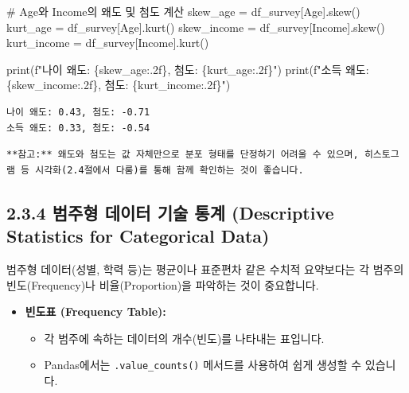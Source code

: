 \documentclass[
  letterpaper,
]{book}
\newenvironment{Shaded}{\begin{snugshade}}{\end{snugshade}}
\newcommand{\BuiltInTok}[1]{\textcolor[rgb]{0.00,0.23,0.31}{#1}}
\newcommand{\CommentTok}[1]{\textcolor[rgb]{0.37,0.37,0.37}{#1}}
\newcommand{\NormalTok}[1]{\textcolor[rgb]{0.00,0.23,0.31}{#1}}
\newcommand{\OperatorTok}[1]{\textcolor[rgb]{0.37,0.37,0.37}{#1}}
\newcommand{\SpecialCharTok}[1]{\textcolor[rgb]{0.37,0.37,0.37}{#1}}
\newcommand{\SpecialStringTok}[1]{\textcolor[rgb]{0.13,0.47,0.30}{#1}}
\newcommand{\StringTok}[1]{\textcolor[rgb]{0.13,0.47,0.30}{#1}}
\providecommand{\tightlist}{%
  \setlength{\itemsep}{0pt}\setlength{\parskip}{0pt}}
\begin{document}
\begin{Shaded}
\begin{Highlighting}[]
    \CommentTok{\# Age와 Income의 왜도 및 첨도 계산}
\NormalTok{    skew\_age }\OperatorTok{=}\NormalTok{ df\_survey[}\StringTok{\textquotesingle{}Age\textquotesingle{}}\NormalTok{].skew()}
\NormalTok{    kurt\_age }\OperatorTok{=}\NormalTok{ df\_survey[}\StringTok{\textquotesingle{}Age\textquotesingle{}}\NormalTok{].kurt()}
\NormalTok{    skew\_income }\OperatorTok{=}\NormalTok{ df\_survey[}\StringTok{\textquotesingle{}Income\textquotesingle{}}\NormalTok{].skew()}
\NormalTok{    kurt\_income }\OperatorTok{=}\NormalTok{ df\_survey[}\StringTok{\textquotesingle{}Income\textquotesingle{}}\NormalTok{].kurt()}

    \BuiltInTok{print}\NormalTok{(}\SpecialStringTok{f"나이 왜도: }\SpecialCharTok{\{}\NormalTok{skew\_age}\SpecialCharTok{:.2f\}}\SpecialStringTok{, 첨도: }\SpecialCharTok{\{}\NormalTok{kurt\_age}\SpecialCharTok{:.2f\}}\SpecialStringTok{"}\NormalTok{)}
    \BuiltInTok{print}\NormalTok{(}\SpecialStringTok{f"소득 왜도: }\SpecialCharTok{\{}\NormalTok{skew\_income}\SpecialCharTok{:.2f\}}\SpecialStringTok{, 첨도: }\SpecialCharTok{\{}\NormalTok{kurt\_income}\SpecialCharTok{:.2f\}}\SpecialStringTok{"}\NormalTok{)}
\end{Highlighting}
\end{Shaded}

\begin{verbatim}
나이 왜도: 0.43, 첨도: -0.71
소득 왜도: 0.33, 첨도: -0.54
\end{verbatim}

\begin{verbatim}
**참고:** 왜도와 첨도는 값 자체만으로 분포 형태를 단정하기 어려울 수 있으며, 히스토그램 등 시각화(2.4절에서 다룸)를 통해 함께 확인하는 것이 좋습니다.
\end{verbatim}

\subsection{2.3.4 범주형 데이터 기술 통계 (Descriptive Statistics for
Categorical
Data)}\label{uxbc94uxc8fcuxd615-uxb370uxc774uxd130-uxae30uxc220-uxd1b5uxacc4-descriptive-statistics-for-categorical-data}

범주형 데이터(성별, 학력 등)는 평균이나 표준편차 같은 수치적 요약보다는
각 범주의 빈도(Frequency)나 비율(Proportion)을 파악하는 것이 중요합니다.

\begin{itemize}
\tightlist
\item
  \textbf{빈도표 (Frequency Table):}

  \begin{itemize}
  \tightlist
  \item
    각 범주에 속하는 데이터의 개수(빈도)를 나타내는 표입니다.
  \item
    Pandas에서는 \texttt{.value\_counts()} 메서드를 사용하여 쉽게 생성할
    수 있습니다.
  \end{itemize}
\end{itemize}
\end{document}

